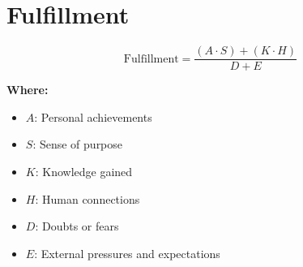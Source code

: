 \chapter{Fulfillment}

\begin{equation}
\text{Fulfillment} = \frac{(A \cdot S) + (K \cdot H)}{D + E}
\end{equation}

\textbf{Where:}

\begin{itemize}
    \item $A$: Personal achievements
    \item $S$: Sense of purpose
    \item $K$: Knowledge gained
    \item $H$: Human connections
    \item $D$: Doubts or fears
    \item $E$: External pressures and expectations
\end{itemize}